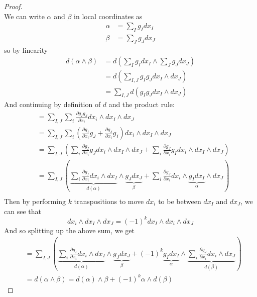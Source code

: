 \documentclass{article}
\begin{document}
\begin{proof} \text{} \\
  We can write $\alpha$ and $\beta$ in local coordinates as \begin{align*}
    \alpha &= \sum_I g_I dx_I \\
    \beta &= \sum_J g_J dx_J
  \end{align*} so by linearity \begin{align*}
    d(\alpha \wedge \beta)
      &= d\left(\sum_I g_I dx_I \wedge \sum_J g_J dx_J\right) \\
      &= d\left(\sum_{I,J} g_I g_J dx_I \wedge dx_J\right) \\
      &= \sum_{I,J} d(g_I g_J dx_I \wedge dx_J)
  \end{align*}
  And continuing by definition of $d$ and the product rule:
  \begin{align*}
      &= \sum_{I,J} \sum_i \frac{\partial g_I g_J}{\partial x_i}dx_i \wedge dx_I \wedge dx_J \\
      &= \sum_{I,J} \sum_i \left(\frac{\partial g_I}{\partial x_i}g_J + \frac{\partial g_J}{\partial x_i}g_I\right)dx_i \wedge dx_I \wedge dx_J \\
      &= \sum_{I,J} \left(
        \sum_i \frac{\partial g_I}{\partial x_i}g_J dx_i \wedge dx_I \wedge dx_J +
        \sum_i \frac{\partial g_J}{\partial x_i}g_Idx_i \wedge dx_I \wedge dx_J
      \right) \\
      &= \sum_{I,J} \left(
        \underbrace{\sum_i \frac{\partial g_I}{\partial x_i} dx_i \wedge dx_I}_{d(\alpha)} \wedge \underbrace{g_Jdx_J}_{\beta} +
        \sum_i \frac{\partial g_J}{\partial x_i}dx_i \wedge \underbrace{g_Idx_I}_\alpha \wedge dx_J
      \right) \\
  \end{align*}
  Then by performing $k$ transpositions to move $dx_i$ to be between $dx_I$ and $dx_J$,
  we can see that \[
    dx_i \wedge dx_I \wedge dx_J = (-1)^kdx_I \wedge dx_i \wedge dx_J
  \]
  And so splitting up the above sum, we get \begin{align*}
    &= \sum_{I,J} \left(
      \underbrace{\sum_i \frac{\partial g_I}{\partial x_i} dx_i \wedge dx_I}_{d(\alpha)} \wedge \underbrace{g_Jdx_J}_{\beta} +
      (-1)^k\underbrace{g_Idx_I}_\alpha \wedge \underbrace{\sum_i \frac{\partial g_J}{\partial x_i} dx_i \wedge dx_J}_{d(\beta)}
    \right)\\
    &= d(\alpha\wedge\beta) = d(\alpha)\wedge\beta + (-1)^k\alpha\wedge d(\beta)
  \end{align*}
\end{proof}
\end{document}
